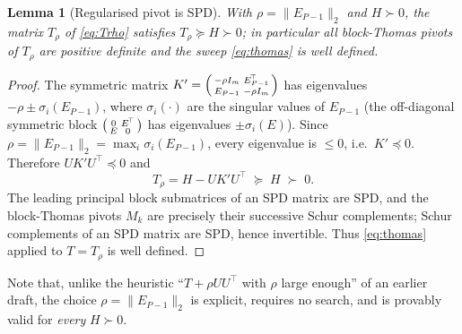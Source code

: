 \documentclass{amsart}
\newtheorem{lemma}{Lemma}
\begin{document}
\begin{lemma}[Regularised pivot is SPD]\label{lem:Trho}
With $\rho=\|E_{P-1}\|_2$ and $H\succ0$, the matrix $T_\rho$ of \eqref{eq:Trho}
satisfies $T_\rho\succeq H\succ0$; in particular all block-Thomas pivots of $T_\rho$
are positive definite and the sweep \eqref{eq:thomas} is well defined.
\end{lemma}

\begin{proof}
The symmetric matrix
$K'=\begin{psmallmatrix}-\rho I_m & E_{P-1}^{\!\top}\\ E_{P-1} & -\rho
I_m\end{psmallmatrix}$ has eigenvalues $-\rho\pm\sigma_i(E_{P-1})$, where
$\sigma_i(\cdot)$ are the singular values of $E_{P-1}$ (the off-diagonal symmetric
block $\begin{psmallmatrix}0&E^{\!\top}\\E&0\end{psmallmatrix}$ has eigenvalues
$\pm\sigma_i(E)$). Since $\rho=\|E_{P-1}\|_2=\max_i\sigma_i(E_{P-1})$, every
eigenvalue is $\le0$, i.e.\ $K'\preceq0$. Therefore $UK'U^{\!\top}\preceq0$ and
\[
  T_\rho=H-UK'U^{\!\top}\;\succeq\;H\;\succ\;0 .
\]
The leading principal block submatrices of an SPD matrix are SPD, and the block-Thomas
pivots $M_k$ are precisely their successive Schur complements; Schur complements of an
SPD matrix are SPD, hence invertible. Thus \eqref{eq:thomas} applied to $T=T_\rho$ is
well defined.
\end{proof}

\noindent Note that, unlike the heuristic ``$T+\rho UU^\top$ with $\rho$ large
enough'' of an earlier draft, the choice $\rho=\|E_{P-1}\|_2$ is explicit, requires no
search, and is provably valid for \emph{every} $H\succ0$.
\end{document}
